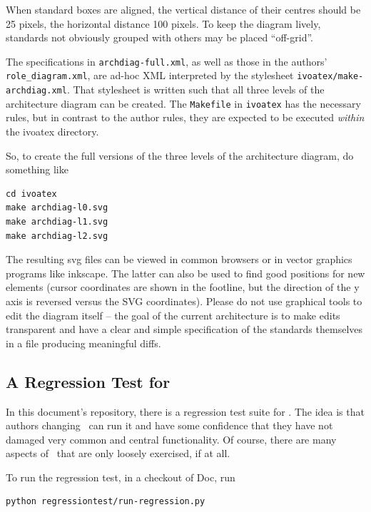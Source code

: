 \documentclass[11pt,a4paper]{ivoa}
\begin{document}
When standard boxes are aligned, the
vertical distance of their centres should be 25 pixels, the horizontal
distance 100 pixels.  To keep the diagram lively, standards not
obviously grouped with others may be placed ``off-grid''.

The specifications in \verb|archdiag-full.xml|, as well as those in
the authors' \verb|role_diagram.xml|, are ad-hoc XML interpreted by the
stylesheet \verb|ivoatex/make-archdiag.xml|.  That stylesheet is
written such that all three levels of the architecture diagram can be
created.  The \verb|Makefile| in \verb|ivoatex| has the necessary
rules, but in contrast to the author rules, they are expected to be
executed \emph{within} the ivoatex directory.

So, to create the full versions of the three levels of the architecture
diagram, do something like

\begin{lstlisting}
cd ivoatex
make archdiag-l0.svg
make archdiag-l1.svg
make archdiag-l2.svg
\end{lstlisting}

The resulting svg files can be viewed in common browsers or in vector
graphics programs like inkscape.  The latter can also be used to find
good positions for new elements (cursor coordinates are shown in the
footline, but the direction of the y axis is reversed versus the SVG
coordinates).  Please do not use graphical tools to edit the diagram
itself -- the goal of the current architecture is to make edits
transparent and have a clear and simple specification of the standards
themselves in a file producing meaningful diffs.

\subsection{A Regression Test for \ivoatex}

In this document's repository, there is a regression test suite for
\ivoatex.  The idea is that authors changing \ivoatex~can run it and
have some confidence that they have not damaged very common and central
functionality.  Of course, there are many aspects of \ivoatex~that are
only loosely exercised, if at all.

To run the regression test, in a checkout of \ivoatex Doc, run

\begin{lstlisting}
python regressiontest/run-regression.py
\end{lstlisting}
\end{document}
